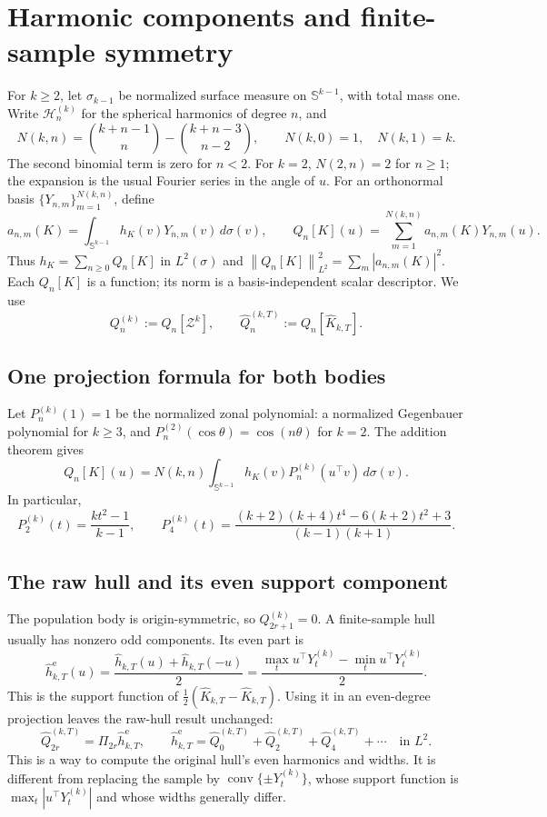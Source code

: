 \documentclass[11pt,a4paper]{article}
\newcommand{\Sph}{\mathbb S}
\newcommand{\norm}[1]{\left\lVert #1\right\rVert}
\newcommand{\conv}{\operatorname{conv}}
\newcommand{\he}{\widehat h^{\mathrm e}}
\newcommand{\hh}{\widehat h}
\newcommand{\hQ}{\widehat Q}
\begin{document}
\section{Harmonic components and finite-sample symmetry}\label{sec:harmonics}
For $k\ge2$, let $\sigma_{k-1}$ be normalized surface measure on $\Sph^{k-1}$,
with total mass one. Write $\mathcal H_n^{(k)}$ for the spherical harmonics of degree
$n$, and
\[
 N(k,n)=\binom{k+n-1}{n}-\binom{k+n-3}{n-2},
 \qquad N(k,0)=1,\quad N(k,1)=k.
\]
The second binomial term is zero for $n<2$. For $k=2$, $N(2,n)=2$ for $n\ge1$;
the expansion is the usual Fourier series in the angle of $u$.
For an orthonormal basis $\{Y_{n,m}\}_{m=1}^{N(k,n)}$, define
\[
 a_{n,m}(K)=\int_{\Sph^{k-1}}h_K(v)Y_{n,m}(v)\,d\sigma(v),\qquad
 Q_n[K](u)=\sum_{m=1}^{N(k,n)}a_{n,m}(K)Y_{n,m}(u).
\]
Thus $h_K=\sum_{n\ge0}Q_n[K]$ in $L^2(\sigma)$ and
$\norm{Q_n[K]}_{L^2}^2=\sum_m|a_{n,m}(K)|^2$. Each $Q_n[K]$ is a function;
its norm is a basis-independent scalar descriptor. We use
\[
 Q_n^{(k)}:=Q_n[\mathcal Z^k],\qquad
 \hQ_n^{(k,T)}:=Q_n[\widehat K_{k,T}].
\]

\subsection*{One projection formula for both bodies}
Let $P_n^{(k)}(1)=1$ be the normalized zonal polynomial: a normalized Gegenbauer
polynomial for $k\ge3$, and $P_n^{(2)}(\cos\theta)=\cos(n\theta)$ for $k=2$.
The addition theorem gives
\[
 \boxed{\quad
 Q_n[K](u)=N(k,n)\int_{\Sph^{k-1}}
 h_K(v)P_n^{(k)}(u^\top v)\,d\sigma(v).
 \quad}
\]
In particular,
\[
 P_2^{(k)}(t)=\frac{kt^2-1}{k-1},\qquad
 P_4^{(k)}(t)=\frac{(k+2)(k+4)t^4-6(k+2)t^2+3}{(k-1)(k+1)}.
\]

\subsection*{The raw hull and its even support component}
The population body is origin-symmetric, so $Q_{2r+1}^{(k)}=0$. A finite-sample
hull usually has nonzero odd components. Its even part is
\[
 \boxed{\quad
 \he_{k,T}(u)=\frac{\hh_{k,T}(u)+\hh_{k,T}(-u)}2
 =\frac{\max_tu^\top Y_t^{(k)}-\min_tu^\top Y_t^{(k)}}2.
 \quad}
\]
This is the support function of $\tfrac12(\widehat K_{k,T}-\widehat K_{k,T})$.
Using it in an even-degree projection leaves the raw-hull result unchanged:
\[
 \hQ_{2r}^{(k,T)}=\Pi_{2r}\he_{k,T},\qquad
 \he_{k,T}=\hQ_0^{(k,T)}+\hQ_2^{(k,T)}+\hQ_4^{(k,T)}+\cdots
 \quad\text{in }L^2.
\]
This is a way to compute the original hull's even harmonics and widths. It is
different from replacing the sample by $\conv\{\pm Y_t^{(k)}\}$, whose support
function is $\max_t|u^\top Y_t^{(k)}|$ and whose widths generally differ.
\end{document}
